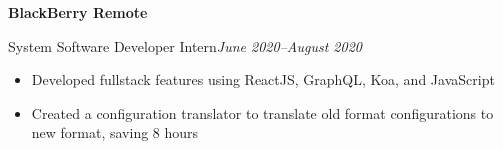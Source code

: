 \textbf{BlackBerry \hfill Remote}\par

System Software Developer Intern\hfill \textit{June 2020--August 2020}
\begin{itemize}
        \item Developed fullstack features using ReactJS, GraphQL, Koa, and JavaScript
        \item Created a configuration translator to translate old format configurations to new format, saving 8 hours
\end{itemize}
